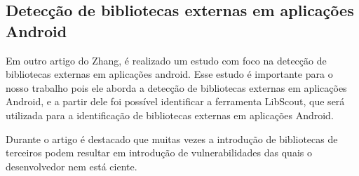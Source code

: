 \subsection{Detecção de bibliotecas externas em aplicações Android} %

Em outro artigo do Zhang, é realizado um estudo com foco na detecção de bibliotecas externas em aplicações android. \cite{api_tpl_zhang} Esse estudo é importante para o nosso trabalho pois ele aborda a detecção de bibliotecas externas em aplicações Android, e a partir dele foi possível identificar a ferramenta LibScout, que será utilizada para a identificação de bibliotecas externas em aplicações Android.

Durante o artigo é destacado que muitas vezes a introdução de bibliotecas de terceiros podem resultar em introdução de vulnerabilidades das quais o desenvolvedor nem está ciente. 






